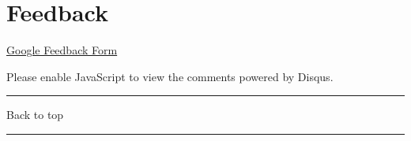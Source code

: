 \documentclass[
]{article}
\begin{document}
\pagebreak

\hypertarget{feedback}{%
\section{Feedback}\label{feedback}}

\href{https://docs.google.com/forms/d/e/1FAIpQLSeD3Z9J6Y7eMmiyM12f_SfAmHUlykb1zxZcwO6lg7cebGYQIQ/viewform}{Google
Feedback Form}

\hypertarget{disqus_thread}{}

Please enable JavaScript to view the comments powered by Disqus.

\begin{center}\rule{0.5\linewidth}{0.5pt}\end{center}

Back to top

\begin{center}\rule{0.5\linewidth}{0.5pt}\end{center}

\pagebreak
\end{document}
